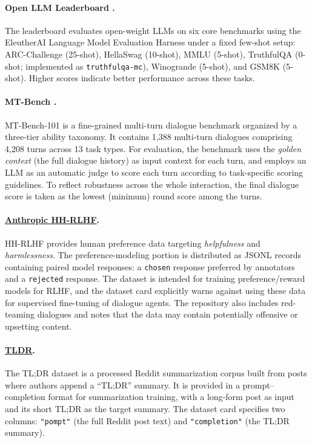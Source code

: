 \documentclass{article}
\theoremstyle{plain}
\theoremstyle{definition}
\theoremstyle{remark}
\begin{document}
\paragraph{Open LLM Leaderboard \cite{huggingface_open_llm_leaderboard_v1}.}
The leaderboard evaluates open-weight LLMs on six core benchmarks using the EleutherAI Language Model Evaluation Harness under a fixed few-shot setup: ARC-Challenge (25-shot), HellaSwag (10-shot), MMLU (5-shot), TruthfulQA (0-shot; implemented as \texttt{truthfulqa-mc}), Winogrande (5-shot), and GSM8K (5-shot). Higher scores indicate better performance across these tasks.

\paragraph{MT-Bench \cite{zheng2023judging}.}
MT-Bench-101 is a fine-grained multi-turn dialogue benchmark organized by a three-tier ability taxonomy. It contains 1{,}388 multi-turn dialogues comprising 4{,}208 turns across 13 task types. For evaluation, the benchmark uses the \emph{golden context} (the full dialogue history) as input context for each turn, and employs an LLM as an automatic judge to score each turn according to task-specific scoring guidelines. To reflect robustness across the whole interaction, the final dialogue score is taken as the lowest (minimum) round score among the turns.

\paragraph{\href{https://huggingface.co/datasets/Anthropic/hh-rlhf}{Anthropic HH-RLHF}.}
HH-RLHF provides human preference data targeting \emph{helpfulness} and \emph{harmlessness}. The preference-modeling portion is distributed as JSONL records containing paired model responses: a \texttt{chosen} response preferred by annotators and a \texttt{rejected} response. The dataset is intended for training preference/reward models for RLHF, and the dataset card explicitly warns against using these data for supervised fine-tuning of dialogue agents. The repository also includes red-teaming dialogues and notes that the data may contain potentially offensive or upsetting content.


\paragraph{\href{https://huggingface.co/datasets/trl-lib/tldr}{TLDR}.}
The TL;DR dataset is a processed Reddit summarization corpus built from posts where authors append a ``TL;DR'' summary. It is provided in a prompt--completion format for summarization training, with a long-form post as input and its short TL;DR as the target summary. The dataset card specifies two columns: \texttt{"pompt"} (the full Reddit post text) and \texttt{"completion"} (the TL;DR summary).
\end{document}
